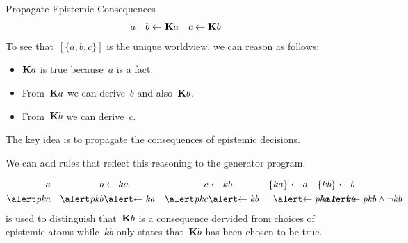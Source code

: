 \documentclass[aspectratio=169,svgnames,xcolor=table,t]{beamer}
\begin{document}
\begin{frame}{Propagate Epistemic Consequences}
    \vspace{-20pt}
    \begin{align*}
        a &&
        b &\leftarrow \mathbf{K} a
        &
        c &\leftarrow \mathbf{K} b
    \end{align*}
    To see that~$[\{a,b,c\}]$ is the unique worldview, we can reason as follows:
    \begin{itemize}
        \item $\mathbf{K} a$ is true because~$a$ is a fact.
        \item From~$\mathbf{K} a$ we can derive~$b$ and also~$\mathbf{K} b$.
        \item From~$\mathbf{K} b$ we can derive~$c$.
    \end{itemize}
    
    \pause
    \begin{myitemize}
        \item The key idea is to propagate the consequences of epistemic decisions.
        \item We can add rules that reflect this reasoning to the generator program.
    \end{myitemize}
    \begin{align*}
        a 
        && 
        b &\leftarrow ka
        &
        c &\leftarrow kb
        &
        \{ ka \} &\leftarrow a
        &
        \{ kb \} &\leftarrow b
        \\
        \hi{\kp{a}}&
        &
        \hi{\kp{b}} &\hi{\leftarrow \kk{a}}
        &
        \hi{\kp{c}} &\hi{\leftarrow \kk{b}}
        &
        \mathrlap{\hspace{-16pt}\hi{\leftarrow \kp{a} \wedge \neg ka}}
        &&
        \mathrlap{\hspace{-16pt}\hi{\leftarrow \kp{b} \wedge \neg \kk{b}}}
    \end{align*}
     is used to distinguish that~$\mathbf{K} b$ is a consequence dervided from choices of epistemic atoms while~$kb$ only states that~$\mathbf{K} b$ has been chosen to be true.
\end{frame}
\end{document}
